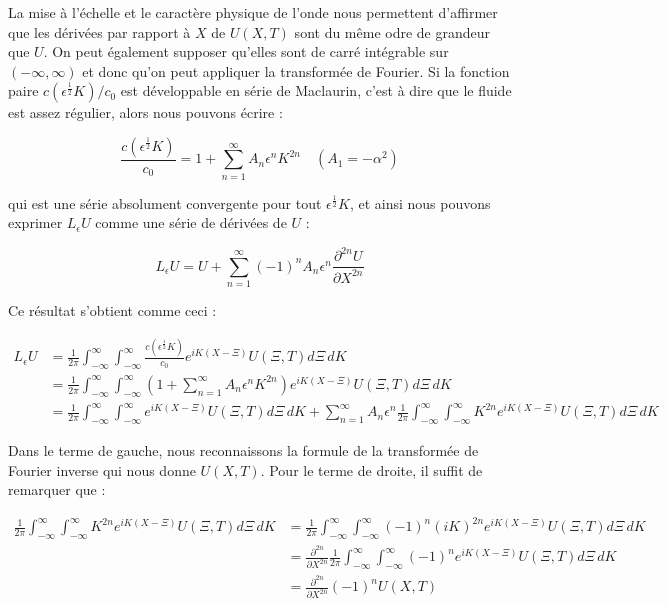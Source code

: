 La mise à l'échelle et le caractère physique de l'onde nous permettent d'affirmer que les dérivées par rapport à $X$ de $U(X,T)$ sont du même odre de grandeur que $U$. On peut également supposer qu'elles sont de carré intégrable sur $(-\infty, \infty)$ et donc qu'on peut appliquer la transformée de Fourier. Si la fonction paire $c(\epsilon^{\frac{1}{2}} K)/c_0$ est développable en série de Maclaurin, c'est à dire que le fluide est assez régulier, alors nous pouvons écrire :

\begin{equation*}
    \frac{c(\epsilon^{\frac{1}{2}} K)}{c_0} = 1 + \sum_{n=1}^{\infty} A_n \epsilon^n K^{2n} \quad (A_1 = -\alpha^2)
\end{equation*}

qui est une série absolument convergente pour tout $\epsilon^{\frac{1}{2}} K$, et ainsi nous pouvons exprimer $L_\epsilon U$ comme une série de dérivées de $U$ :

\begin{equation*}
    L_\epsilon U = U + \sum_{n=1}^{\infty} (-1)^n A_n \epsilon^n \frac{\partial^{2n} U}{\partial X^{2n}}
\end{equation*}

Ce résultat s'obtient comme ceci :

\begin{align*}
    L_\epsilon U &= \frac{1}{2\pi} \int_{-\infty}^{\infty} \int_{-\infty}^{\infty} \frac{c(\epsilon^{\frac{1}{2}} K)}{c_0} e^{iK(X - \Xi)} U(\Xi, T) d\Xi \, dK\\
    &= \frac{1}{2\pi} \int_{-\infty}^{\infty} \int_{-\infty}^{\infty} \left( 1 + \sum_{n=1}^{\infty} A_n \epsilon^n K^{2n} \right)e^{iK(X - \Xi)} U(\Xi, T) d\Xi \, dK\\
    &= \frac{1}{2\pi} \int_{-\infty}^{\infty} \int_{-\infty}^{\infty} e^{iK(X - \Xi)} U(\Xi, T) d\Xi \, dK + \sum_{n=1}^{\infty} A_n \epsilon^n \frac{1}{2\pi} \int_{-\infty}^{\infty} \int_{-\infty}^{\infty} K^{2n} e^{iK(X - \Xi)} U(\Xi, T) d\Xi \, dK
\end{align*}

Dans le terme de gauche, nous reconnaissons la formule de la transformée de Fourier inverse qui nous donne $U(X,T)$. Pour le terme de droite, il suffit de remarquer que :

\begin{align*}
    \frac{1}{2\pi} \int_{-\infty}^{\infty} \int_{-\infty}^{\infty} K^{2n} e^{iK(X - \Xi)} U(\Xi, T) d\Xi \, dK &= \frac{1}{2\pi} \int_{-\infty}^{\infty} \int_{-\infty}^{\infty} (-1)^n(iK)^{2n} e^{iK(X - \Xi)} U(\Xi, T) d\Xi \, dK\\
    &= \frac{\partial^{2n}}{\partial X^{2n}} \frac{1}{2\pi} \int_{-\infty}^{\infty} \int_{-\infty}^{\infty} (-1)^ne^{iK(X - \Xi)} U(\Xi, T) d\Xi \, dK\\
    &= \frac{\partial^{2n}}{\partial X^{2n}} (-1)^n U(X,T)
\end{align*}


